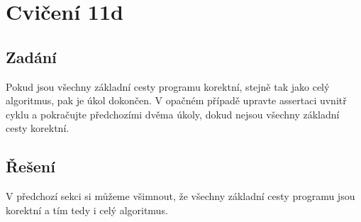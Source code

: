 \documentclass{article}
\begin{document}
\section{Cvičení 11d}

\subsection{Zadání}
Pokud jsou všechny základní cesty programu korektní, stejně tak jako celý algoritmus, pak je úkol dokončen. V opačném případě upravte assertaci uvnitř cyklu a pokračujte předchozími dvěma úkoly, dokud nejsou všechny základní cesty korektní.

\subsection{Řešení}
V předchozí sekci si můžeme všimnout, že všechny základní cesty programu jsou korektní a tím tedy i celý algoritmus.
\end{document}
